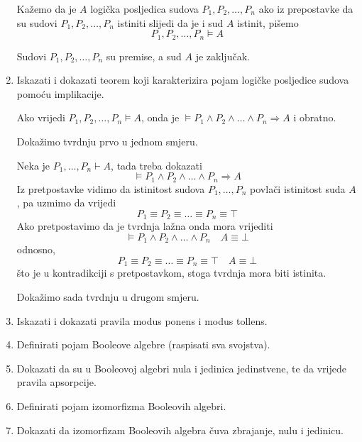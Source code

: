 \documentclass{article}
\begin{document}
\begin{enumerate}
Kažemo da je $A$ logička posljedica sudova $P_1, P_2, \ldots, P_n$ ako iz prepostavke da su sudovi $P_1, P_2, \ldots, P_n$ istiniti slijedi da je i sud $A$ istinit, pišemo
$$P_1, P_2, \ldots, P_n\vDash A$$

Sudovi $P_1, P_2, \ldots, P_n$ su premise, a sud $A$ je zaključak.

\item Iskazati i dokazati teorem koji karakterizira pojam logičke posljedice sudova pomoću implikacije.

Ako vrijedi $P_1, P_2, \ldots, P_n\vDash A$, onda je $\vDash P_1\land P_2\land\ldots\land P_n\Rightarrow A$ i obratno.

Dokažimo tvrdnju prvo u jednom smjeru.

Neka je $P_1, \ldots, P_n\vdash A$, tada treba dokazati $$\vDash P_1\land P_2\land\ldots\land P_n\Rightarrow A$$ 
Iz pretpostavke vidimo da istinitost sudova $P_1, \ldots, P_n$ povlači istinitost suda $A$, pa uzmimo da vrijedi 
$$P_1\equiv P_2\equiv\ldots\equiv P_n\equiv\top$$ 
Ako pretpostavimo da je tvrdnja lažna onda mora vrijediti
$$\vDash P_1\land P_2\land\ldots\land P_n\quad A\equiv\bot$$
odnosno,
$$P_1\equiv P_2\equiv\ldots\equiv P_n\equiv\top\quad A\equiv\bot$$
što je u kontradikciji s pretpostavkom, stoga tvrdnja mora biti istinita.

Dokažimo sada tvrdnju u drugom smjeru.

\item Iskazati i dokazati pravila modus ponens i modus tollens.

\item Definirati pojam Booleove algebre (raspisati sva svojstva).

\item Dokazati da su u Booleovoj algebri nula i jedinica jedinstvene, te da vrijede pravila apsorpcije.

\item Definirati pojam izomorfizma Booleovih algebri.

\item Dokazati da izomorfizam Booleovih algebra čuva zbrajanje, nulu i jedinicu.

\end{enumerate}
\end{document}
